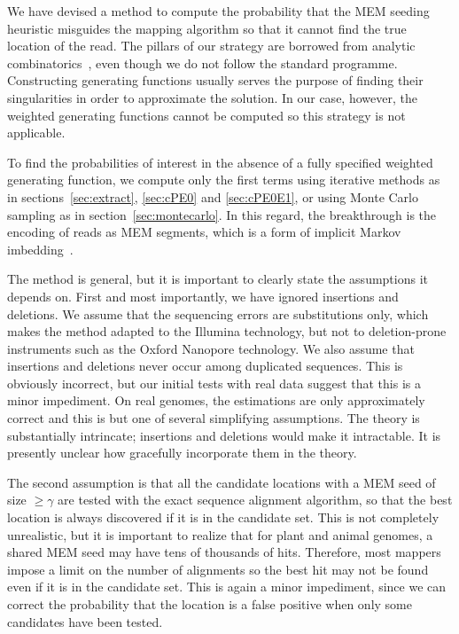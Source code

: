 \documentclass{article}
\begin{document}
We have devised a method to compute the probability that the MEM seeding
heuristic misguides the mapping algorithm so that it cannot find the true
location of the read. The pillars of our strategy are borrowed from
analytic combinatorics~\cite{flajolet2009analytic,
sedgewick2013introduction}, even though we do not follow the standard
programme. Constructing generating functions usually serves the purpose of
finding their singularities in order to approximate the solution. In our
case, however, the weighted generating functions cannot be computed so
this strategy is not applicable.

To find the probabilities of interest in the absence of a fully specified
weighted generating function, we compute only the first terms using
iterative methods as in sections~\ref{sec:extract}, \ref{sec:cPE0} and
\ref{sec:cPE0E1}, or using Monte Carlo sampling as in
section~\ref{sec:montecarlo}. In this regard, the breakthrough is the
encoding of reads as MEM segments, which is a form of implicit Markov
imbedding~\cite{fu1994distribution}.

The method is general, but it is important to clearly state the
assumptions it depends on. First and most importantly, we have ignored
insertions and deletions. We assume that the sequencing errors are
substitutions only, which makes the method adapted to the Illumina
technology, but not to deletion-prone instruments such as the Oxford
Nanopore technology. We also assume that insertions and deletions never
occur among duplicated sequences. This is obviously incorrect, but our
initial tests with real data suggest that this is a minor impediment. On
real genomes, the estimations are only approximately correct and this is
but one of several simplifying assumptions. The theory is substantially
intrincate; insertions and deletions would make it intractable.
It is presently unclear how gracefully incorporate them in the theory.

The second assumption is that all the candidate locations with a MEM
seed of size $\geq \gamma$ are tested with the exact sequence alignment
algorithm, so that the best location is always discovered if it is in the
candidate set. This is not completely unrealistic, but it is important to
realize that for plant and animal genomes, a shared MEM seed may have tens
of thousands of hits. Therefore, most mappers impose a limit on the number
of alignments so the best hit may not be found even if it is in the
candidate set. This is again a minor impediment, since we can correct the
probability that the location is a false positive when only some
candidates have been tested.
\end{document}

